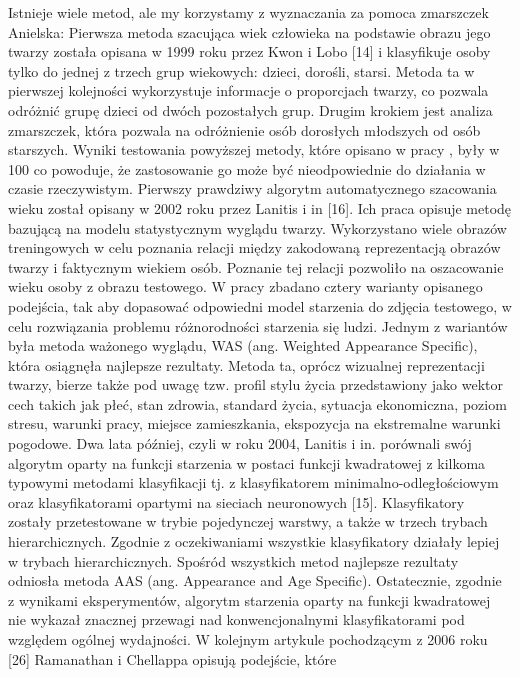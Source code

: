 Istnieje wiele metod, ale my korzystamy z wyznaczania za pomoca zmarszczek
Anielska:
Pierwsza metoda szacująca wiek człowieka na podstawie obrazu jego twarzy została opisana w 1999 roku przez
Kwon i Lobo [14] i klasyfikuje osoby tylko do jednej z trzech grup wiekowych:
dzieci, dorośli, starsi. Metoda ta w pierwszej kolejności wykorzystuje informacje o
proporcjach twarzy, co pozwala odróżnić grupę dzieci od dwóch pozostałych grup.
Drugim krokiem jest analiza zmarszczek, która pozwala na odróżnienie osób dorosłych
młodszych od osób starszych. Wyniki testowania powyższej metody, które opisano w pracy
, były w 100%
co powoduje, że zastosowanie go może być nieodpowiednie do działania w czasie rzeczywistym.
Pierwszy prawdziwy algorytm automatycznego szacowania wieku został opisany w 2002 roku
przez Lanitis i in [16]. Ich praca opisuje metodę bazującą na modelu statystycznym wyglądu twarzy.
Wykorzystano wiele obrazów treningowych w celu poznania relacji między zakodowaną reprezentacją obrazów
twarzy i faktycznym wiekiem osób. Poznanie tej relacji pozwoliło na oszacowanie wieku osoby z obrazu
testowego. W pracy zbadano cztery warianty opisanego podejścia, tak aby dopasować odpowiedni model
starzenia do zdjęcia testowego, w celu rozwiązania problemu różnorodności starzenia się ludzi. Jednym
z wariantów była metoda ważonego wyglądu, WAS (ang. Weighted Appearance Specific), która osiągnęła
najlepsze rezultaty. Metoda ta, oprócz wizualnej reprezentacji twarzy, bierze także pod uwagę tzw.
profil stylu życia przedstawiony jako wektor cech takich jak płeć, stan zdrowia, standard życia,
sytuacja ekonomiczna, poziom stresu, warunki pracy, miejsce zamieszkania, ekspozycja na ekstremalne
warunki pogodowe. Dwa lata później, czyli w roku 2004, Lanitis i in. porównali swój algorytm oparty
na funkcji starzenia w postaci funkcji kwadratowej z kilkoma typowymi metodami klasyfikacji tj. z
klasyfikatorem minimalno-odległościowym oraz klasyfikatorami opartymi na sieciach neuronowych [15].
Klasyfikatory zostały przetestowane w trybie pojedynczej warstwy, a także w trzech trybach hierarchicznych.
Zgodnie z oczekiwaniami wszystkie klasyfikatory działały lepiej w trybach hierarchicznych.
Spośród wszystkich metod najlepsze rezultaty odniosła metoda AAS (ang. Appearance and Age Specific).
Ostatecznie, zgodnie z wynikami eksperymentów, algorytm starzenia oparty na funkcji kwadratowej
nie wykazał znacznej przewagi nad konwencjonalnymi klasyfikatorami pod względem ogólnej wydajności.
W kolejnym artykule pochodzącym z 2006 roku [26] Ramanathan i Chellappa opisują podejście, które
